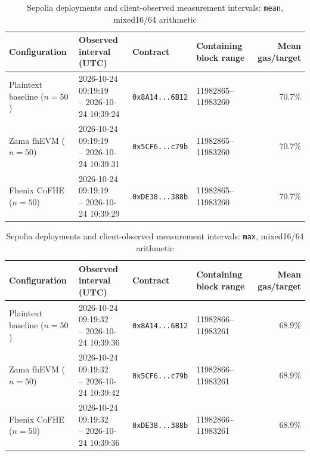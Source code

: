 \begin{table}[!t]
\caption{Sepolia deployments and client-observed measurement intervals: \texttt{mean}, mixed16/64 arithmetic}
\label{tab:sepolia-client-intervals-reference-mixed-oct24-mean}
\centering
\footnotesize
\setlength{\tabcolsep}{4pt}
\begin{tabular}{|l|l|l|l|r|}
\hline
\textbf{Configuration} &
\textbf{Observed interval (UTC)} &
\textbf{Contract} &
\textbf{Containing block range} &
\textbf{Mean gas/target} \\
\hline
Plaintext baseline (\(n=50\)) &
\shortstack[l]{2026-10-24 09:19:19 \\ -- 2026-10-24 10:39:24} &
\texttt{0x8A14...6B12} &
11982865--11983260 &
70.7\% \\
\hline
Zama fhEVM (\(n=50\)) &
\shortstack[l]{2026-10-24 09:19:19 \\ -- 2026-10-24 10:39:31} &
\texttt{0x5CF6...c79b} &
11982865--11983260 &
70.7\% \\
\hline
Fhenix CoFHE (\(n=50\)) &
\shortstack[l]{2026-10-24 09:19:19 \\ -- 2026-10-24 10:39:29} &
\texttt{0xDE38...388b} &
11982865--11983260 &
70.7\% \\
\hline
\end{tabular}
\end{table}

\begin{table}[!t]
\caption{Sepolia deployments and client-observed measurement intervals: \texttt{max}, mixed16/64 arithmetic}
\label{tab:sepolia-client-intervals-reference-mixed-oct24-max}
\centering
\footnotesize
\setlength{\tabcolsep}{4pt}
\begin{tabular}{|l|l|l|l|r|}
\hline
\textbf{Configuration} &
\textbf{Observed interval (UTC)} &
\textbf{Contract} &
\textbf{Containing block range} &
\textbf{Mean gas/target} \\
\hline
Plaintext baseline (\(n=50\)) &
\shortstack[l]{2026-10-24 09:19:32 \\ -- 2026-10-24 10:39:36} &
\texttt{0x8A14...6B12} &
11982866--11983261 &
68.9\% \\
\hline
Zama fhEVM (\(n=50\)) &
\shortstack[l]{2026-10-24 09:19:32 \\ -- 2026-10-24 10:39:42} &
\texttt{0x5CF6...c79b} &
11982866--11983261 &
68.9\% \\
\hline
Fhenix CoFHE (\(n=50\)) &
\shortstack[l]{2026-10-24 09:19:32 \\ -- 2026-10-24 10:39:36} &
\texttt{0xDE38...388b} &
11982866--11983261 &
68.9\% \\
\hline
\end{tabular}
\end{table}
